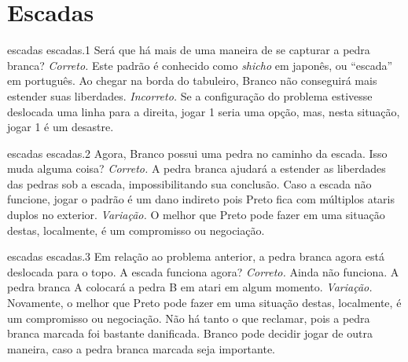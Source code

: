 \chapter{Escadas}

\emptypage

\problemAnswerDiagram
  {escadas}
  {escadas.1}
  {Será que há mais de uma maneira de se capturar a pedra branca?}
  {\emph{Correto.} Este padrão é conhecido como \emph{shicho} em japonês, ou ``escada'' em português. Ao chegar na borda do tabuleiro, Branco não conseguirá mais estender suas liberdades.}
  {\emph{Incorreto.} Se a configuração do problema estivesse deslocada uma linha para a direita, jogar 1 seria uma opção, mas, nesta situação, jogar 1 é um desastre.}

\problemAnswerDiagram
  {escadas}
  {escadas.2}
  {Agora, Branco possui uma pedra no caminho da escada. Isso muda alguma coisa?}
  {\emph{Correto.} A pedra branca ajudará a estender as liberdades das pedras sob a escada, impossibilitando sua conclusão. Caso a escada não funcione, jogar o padrão é um dano indireto pois Preto fica com múltiplos ataris duplos no exterior.}
  {\emph{Variação.} O melhor que Preto pode fazer em uma situação destas, localmente, é um compromisso ou negociação.}


\problemAnswerDiagram
  {escadas}
  {escadas.3}
  {Em relação ao problema anterior, a pedra branca agora está deslocada para o topo. A escada funciona agora?}
  {\emph{Correto.} Ainda não funciona. A pedra branca A colocará a pedra B em atari em algum momento.}
  {\emph{Variação.} Novamente, o melhor que Preto pode fazer em uma situação destas, localmente, é um compromisso ou negociação. Não há tanto o que reclamar, pois a pedra branca marcada foi bastante danificada. Branco pode decidir jogar de outra maneira, caso a pedra branca marcada seja importante.}